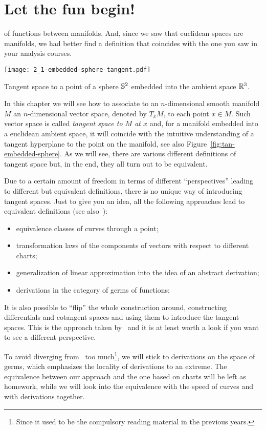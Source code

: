 \section{Let the fun begin!}
 of functions between manifolds.
And, since we saw that euclidean spaces are manifolds, we had better find a definition that coincides with the one you saw in your analysis courses.

\begin{marginfigure}[7em]
  \texttt{[image: 2\_1-embedded-sphere-tangent.pdf]}
  \label{fig:tan-embedded-sphere}
  \caption{Tangent space to a point of a sphere $\mathbb{S}^2$ embedded into the ambient space $\mathbb{R}^3$.}
\end{marginfigure}
In this chapter we will see how to associate to an $n$-dimensional smooth manifold $M$ an $n$-dimensional vector space, denoted by $T_x M$, to each point $x\in M$.
Such vector space is called \emph{tangent space to $M$ at $x$} and, for a manifold embedded into a euclidean ambient space, it will coincide with the intuitive understanding of a tangent hyperplane to the point on the manifold, see also Figure~\ref{fig:tan-embedded-sphere}.
As we will see, there are various different definitions of tangent space but, in the end, they all turn out to be equivalent.

Due to a certain amount of freedom in terms of different ``perspectives'' leading to different but equivalent definitions, there is no unique way of introducing tangent spaces.
Just to give you an idea, all the following approaches lead to equivalent definitions (see also~\cite{book:lee}):
\begin{itemize}
  \item equivalence classes of curves through a point;
  \item transformation laws of the components of vectors with respect to different charts;
  \item generalization of linear approximation into the idea of an abstract derivation;
  \item derivations in the category of germs of functions;
\end{itemize}

It is also possible to ``flip'' the whole construction around, constructing differentials and cotangent spaces and using them to introduce the tangent spaces.
This is the approach taken by~\cite{lectures:hitchin} and it is at least worth a look if you want to see a different perspective.

To avoid diverging from~\cite{book:tu} too much\footnote{Since it used to be the compulsory reading material in the previous years.}, we will stick to derivations on the space of germs, which emphasizes the locality of derivations to an extreme.
The equivalence between our approach and the one based on charts will be left as homework, while we will look into the equivalence with the speed of curves and with derivations together.

